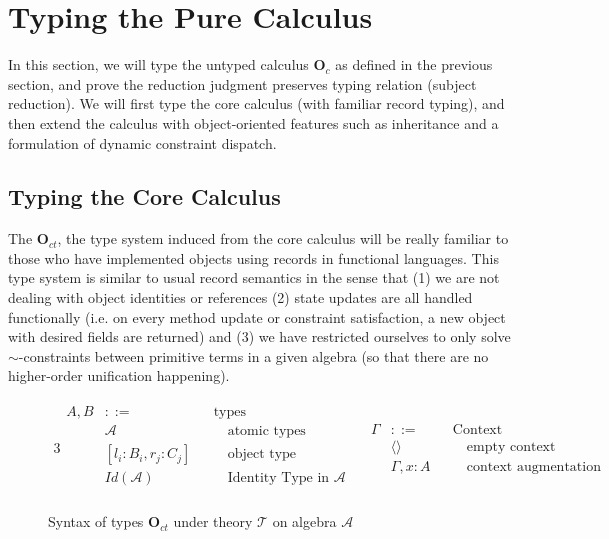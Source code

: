 \section{Typing the Pure Calculus}

In this section, we will type the untyped calculus $\textbf{O}_c$ as defined in the previous
section, and prove the reduction judgment preserves typing relation (subject
reduction). We will first type the core calculus (with familiar record typing),
and then extend the calculus with object-oriented features such as inheritance
and a formulation of dynamic constraint dispatch.

\subsection{Typing the Core Calculus}

The $\textbf{O}_{ct}$, the type system induced from the core calculus will be
really familiar to those who have implemented objects using records in
functional languages. This type system is similar to usual record semantics in
the sense that (1) we are not dealing with object identities or references (2)
state updates are all handled functionally (i.e. on every method update or
constraint satisfaction, a new object with desired fields are returned) and (3)
we have restricted ourselves to only solve $\sim$-constraints between primitive
terms in a given algebra (so that there are no higher-order unification
happening).\\

\begin{figure*}[t]
  \centering
  \begin{alignat*}{3}
    \begin{aligned}
      A,B & ::=                     && \text{types}\\
          & \mathcal{A}             && \quad \text{atomic types}\\
          & [l_i : B_i , r_j : C_j] && \quad \text{object type}\\
          & Id(\mathcal{A})         && \quad \text{Identity Type in } \mathcal{A}\\
    \end{aligned}
    \quad
    \begin{aligned}
      \Gamma & ::= && \text{Context}\\
             & \langle  \rangle && \quad \text{empty context}\\
             & \Gamma , x : A   && \quad \text{context augmentation}
    \end{aligned}
  \end{alignat*}
  \caption{Syntax of types $\textbf{O}_{ct}$ under theory $\mathcal{T}$ on algebra $\mathcal{A}$}
  \label{Oct:syntax}
\end{figure*}

